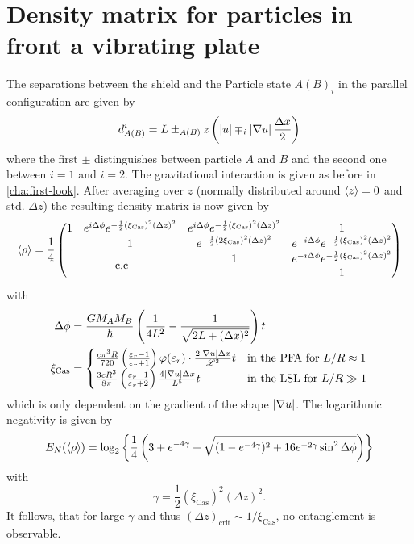 \section{Density matrix for particles in front a vibrating plate} \label{apx:density-matrix-vibrating-plate}
The separations between the shield and the Particle state $A(B)_i$ in the parallel configuration are given by
\begin{equation}
  d^i_{A(B)} = L \pm_{A(B)} z \left(\left\lvert u\right\rvert \mp_i \left\lvert\nabla u\right\rvert \frac{\Delta x}{2}\right)
\end{equation}
where the first $\pm$ distinguishes between particle $A$ and $B$ and the second one between $i=1$ and $i=2$. The gravitational interaction is given as before in \cref{cha:first-look}.
After averaging over $z$ (normally distributed around $\left\langle z\right\rangle = 0$ and std. $\Delta z$) the resulting density matrix is now given by
\begin{equation}
  \mean{\rho} = \frac{1}{4} \begin{pmatrix}
    1 & e^{i \Delta \phi} e^{- \frac{1}{2} (\xi_\mathrm{Cas})^2 (\Delta z)^2} & e^{i \Delta \phi} e^{- \frac{1}{2} (\xi_\mathrm{Cas})^2 (\Delta z)^2} & 1 \\
    & 1 & e^{- \frac{1}{2} (2 \xi_\mathrm{Cas})^2 (\Delta z)^2} & e^{-i \Delta \phi} e^{- \frac{1}{2} (\xi_\mathrm{Cas})^2(\Delta z)^2} \\
    \multicolumn{2}{c}{\multirow{2}{*}{c.c}} & 1 & e^{-i \Delta \phi} e^{- \frac{1}{2} (\xi_\mathrm{Cas})^2 (\Delta z)^2} \\
    & & & 1
  \end{pmatrix}
\end{equation}
with
\begin{align}
  \Delta \phi &= \frac{G M_A M_B}{\hbar} \left(\frac{1}{4L^2} - \frac{1}{\sqrt{2L + (\Delta x)^2}}\right) t \\
  \xi_\mathrm{Cas} &= \begin{cases}
    \frac{c \pi^3 R}{720} \left(\frac{\varepsilon_r - 1}{\varepsilon_r + 1}\right)\varphi(\varepsilon_r)\cdot \frac{2 \left\lvert\nabla u\right\rvert \Delta x}{\mathscr{L}^3} t & \text{in the PFA for }L / R \approx 1 \\
    \frac{3c R^3}{8\pi} \left(\frac{\varepsilon_r - 1}{\varepsilon_r + 2}\right)\frac{4\left\lvert\nabla u\right\rvert\Delta x}{L^5}t & \text{in the LSL for } L / R \gg 1
  \end{cases}
\end{align}
which is only dependent on the gradient of the shape $\left\lvert\nabla u\right\rvert$.
The logarithmic negativity is given by
\begin{equation}\label{eq:apx:en-thermal-shield}
  E_N(\left\langle\rho\right\rangle) = \log_2\left\{\frac{1}{4}\left(3 + e^{-4 \gamma}+\sqrt{(1-e^{-4\gamma})^2 + 16e^{-2\gamma}\sin^2\Delta\phi}\right)\right\}
\end{equation}
with 
\begin{equation}\label{eq:apx:decoherence-naive-vibration}
  \gamma = \frac{1}{2}(\xi_\mathrm{Cas})^2(\Delta z)^2 .
\end{equation}
It follows, that for large $\gamma$ and thus $(\Delta z)_\mathrm{crit} \sim 1/\xi_\mathrm{Cas}$, no entanglement is observable.


